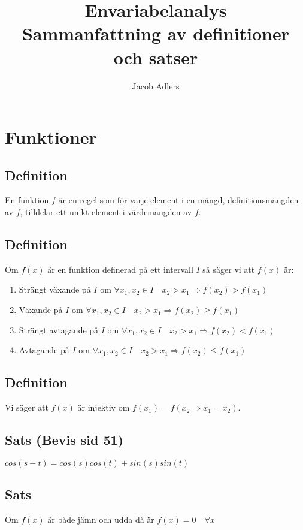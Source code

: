 \documentclass{article}
\title{Envariabelanalys\\Sammanfattning av definitioner och satser}
\author{Jacob Adlers}
\begin{document}
\maketitle
\newpage

\section{Funktioner}
\subsection{Definition}
En funktion $f$ är en regel som för varje element i en mängd, definitionsmängden av $f$, tilldelar ett unikt element i värdemängden av $f$.

\subsection{Definition}
Om $f(x)$ är en funktion definerad på ett intervall $I$ så säger vi att $f(x)$ är:

\begin{enumerate}
   \item Strängt växande på $I$ om $\forall x_{1},x_{2}\in I \quad x_{2}>x_{1} \Rightarrow f(x_{2})>f(x_{1})$
   \item Växande på $I$ om $\forall x_{1},x_{2}\in I \quad x_{2}>x_{1} \Rightarrow f(x_{2})\geq f(x_{1})$
   \item Strängt avtagande på $I$ om $\forall x_{1},x_{2}\in I \quad x_{2}>x_{1} \Rightarrow f(x_{2})<f(x_{1})$
   \item Avtagande på $I$ om $\forall x_{1},x_{2}\in I \quad x_{2}>x_{1} \Rightarrow f(x_{2})\leq f(x_{1})$
\end{enumerate}

\subsection{Definition}
Vi säger att $f(x)$ är injektiv om $f(x_{1})=f(x_{2}\Rightarrow x_{1}=x_{2})$.

\subsection{Sats (Bevis sid 51)}
$cos(s-t)=cos(s)cos(t)+sin(s)sin(t)$

\subsection{Sats}
Om $f(x)$ är både jämn och udda då är $f(x)=0 \quad \forall x $
\end{document}
